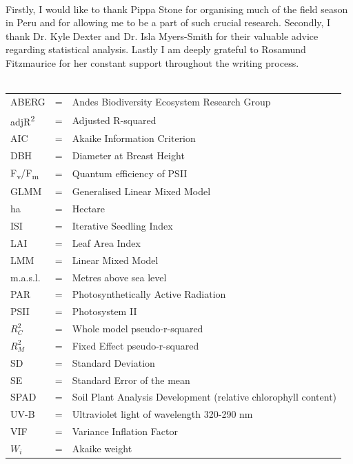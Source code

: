 \documentclass[a4paper,10pt,]{report}
\begin{document}
\\
\vspace{0.2cm}
Firstly, I would like to thank Pippa Stone for organising much of the field season in Peru and for allowing me to be a part of such crucial research. Secondly, I thank Dr. Kyle Dexter and Dr. Isla Myers-Smith for their valuable advice regarding statistical analysis. Lastly I am deeply grateful to Rosamund Fitzmaurice for her constant support throughout the writing process.
\vspace{12cm}\\
\vspace{0.5cm}\\
\begin{tabular}{ l l l }
ABERG & = & Andes Biodiversity Ecosystem Research Group \\
adjR\textsuperscript{2} & = & Adjusted R-squared\\
AIC & = &Akaike Information Criterion\\
DBH &= &Diameter at Breast Height\\
F\textsubscript{v}/F\textsubscript{m} & = & Quantum efficiency of PSII \\
GLMM &=& Generalised Linear Mixed Model\\
ha & = & Hectare\\
ISI &= &Iterative Seedling Index\\
LAI &= &Leaf Area Index\\
LMM& = &Linear Mixed Model\\
m.a.s.l. & = & Metres above sea level\\
PAR& = &Photosynthetically Active Radiation\\
PSII & = & Photosystem II\\
$R_C^2$ & = & Whole model pseudo-r-squared\\
$R_M^2$ & = & Fixed Effect pseudo-r-squared\\
SD & = & Standard Deviation\\
SE & = & Standard Error of the mean\\
SPAD & = & Soil Plant Analysis Development (relative chlorophyll content)\\
UV-B & = & Ultraviolet light of wavelength 320-290 nm\\
VIF & = & Variance Inflation Factor\\
$W_i$ & = & Akaike weight\\


\end{tabular}
\end{document}
